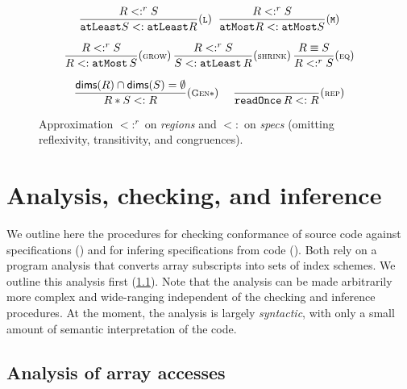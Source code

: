 \documentclass[10pt,preprint,numbers]{sigplanconf}
\theoremstyle{definition}
\newcommand{\term}[1]{\texttt{#1}}
\newcommand{\trule}[1]{{\footnotesize{(\text{#1})}}}
\begin{document}
\begin{figure}[t]
\begin{align*}
{{\begin{array}{c}
%
%
\dfrac{R <:^r S}{\term{atLeast}  S <: \term{atLeast}
  R}\trule{\texttt{L}}
\;\;
\dfrac{R <:^r S}{\term{atMost}  R <: \term{atMost}
  S}\trule{\texttt{M}} \\[1.5em]
\dfrac{R <:^r S}{R <: \term{atMost} \, S}\trule{\textsc{grow}} \,
\dfrac{R <:^r S}{S <: \term{atLeast} \, R}\trule{\textsc{shrink}} \,
\dfrac{R \equiv S}{R <:^r S}\trule{\textsc{eq}}
 \\[1.5em]
\dfrac{\mathsf{dims}(R) \cap \mathsf{dims}(S) = \emptyset}{R \ast S <: R}
\trule{\textsc{Gen$\ast$}}
\quad
\;
\dfrac{}{\term{readOnce} \, R <: R}\trule{\textsc{rep}}
\end{array}}}
\end{align*}
\vspace{-0.5em}
\caption{Approximation $<:^r$ on \textit{regions} and
$<:$ on \textit{specs} (omitting reflexivity, transitivity, and congruences). }
\label{fig:inequations}
\vspace{-0.5em}
\end{figure}

\section{Analysis, checking, and inference}
\label{sec:analysis}

\noindent
We outline here the procedures for checking conformance
of source code against specifications ()
and for infering specifications from code ().
Both rely on a program analysis that converts array subscripts
 into sets of index schemes. We outline this analysis
first (\cref{subsec:analysis}). Note that the analysis 
can be made arbitrarily more complex and wide-ranging independent
of the checking and inference procedures. At the moment, the analysis
is largely \emph{syntactic}, with only a small amount of
semantic interpretation of the code.

\subsection{Analysis of array accesses}
\label{subsec:analysis}
\end{document}
